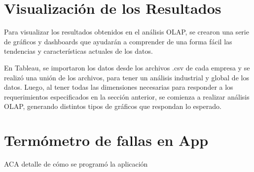 \documentclass[letter,12pt,oneside]{report}
\begin{document}
\section{Visualización de los Resultados}
Para visualizar los resultados obtenidos en el análisis OLAP, se crearon una serie de gráficos y dashboards que ayudarán a comprender de una forma fácil las tendencias y características actuales de los datos.

En Tableau, se importaron los datos desde los archivos .csv de cada empresa y se realizó una unión de los archivos, para tener un análisis industrial y global de los datos. Luego, al tener todas las dimensiones necesarias para responder a los requerimientos especificados en la sección anterior, se comienza a realizar análisis OLAP, generando distintos tipos de gráficos que respondan lo esperado.

\section{Termómetro de fallas en App}
ACA detalle de cómo se programó la aplicación




\newpage
\fancyhf{}
\lhead{\leftmark}
\fancyfoot[R]{\thepage}



\end{document}
